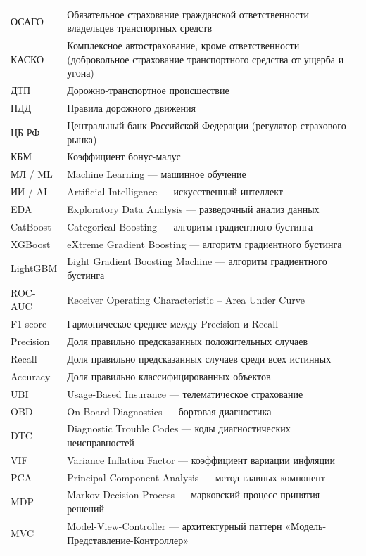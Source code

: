{\footnotesize
\begin{tabular}{@{}lp{10cm}@{}}
ОСАГО & Обязательное страхование гражданской ответственности владельцев транспортных средств \\[4pt]
КАСКО & Комплексное автострахование, кроме ответственности (добровольное страхование транспортного средства от ущерба и угона) \\[4pt]
ДТП & Дорожно-транспортное происшествие \\[4pt]
ПДД & Правила дорожного движения \\[4pt]
ЦБ РФ & Центральный банк Российской Федерации (регулятор страхового рынка) \\[4pt]
КБМ & Коэффициент бонус-малус \\[4pt]
МЛ / ML & Machine Learning --- машинное обучение \\[4pt]
ИИ / AI & Artificial Intelligence --- искусственный интеллект \\[4pt]
EDA & Exploratory Data Analysis --- разведочный анализ данных \\[4pt]
CatBoost & Categorical Boosting --- алгоритм градиентного бустинга \\[4pt]
XGBoost & eXtreme Gradient Boosting --- алгоритм градиентного бустинга \\[4pt]
LightGBM & Light Gradient Boosting Machine --- алгоритм градиентного бустинга \\[4pt]
ROC-AUC & Receiver Operating Characteristic -- Area Under Curve \\[4pt]
F1-score & Гармоническое среднее между Precision и Recall \\[4pt]
Precision & Доля правильно предсказанных положительных случаев \\[4pt]
Recall & Доля правильно предсказанных случаев среди всех истинных \\[4pt]
Accuracy & Доля правильно классифицированных объектов \\[4pt]
UBI & Usage-Based Insurance --- телематическое страхование \\[4pt]
OBD & On-Board Diagnostics --- бортовая диагностика \\[4pt]
DTC & Diagnostic Trouble Codes --- коды диагностических неисправностей \\[4pt]
VIF & Variance Inflation Factor --- коэффициент вариации инфляции \\[4pt]
PCA & Principal Component Analysis --- метод главных компонент \\[4pt]
MDP & Markov Decision Process --- марковский процесс принятия решений \\[4pt]
MVC & Model-View-Controller --- архитектурный паттерн «Модель-Представление-Контроллер» \\[4pt]
\end{tabular}

}
